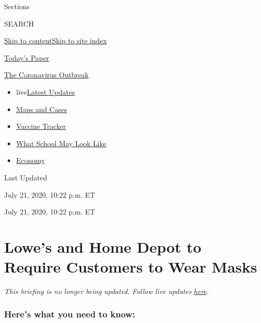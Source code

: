 Sections

SEARCH

\protect\hyperlink{site-content}{Skip to
content}\protect\hyperlink{site-index}{Skip to site index}

\href{https://myaccount.nytimes.com/auth/login?response_type=cookie\&client_id=vi}{}

\href{https://www.nytimes.com/section/todayspaper}{Today's Paper}

\href{https://www.nytimes.com/news-event/coronavirus}{The Coronavirus
Outbreak}

\begin{itemize}
\tightlist
\item
  live\href{https://www.nytimes.com/2020/08/01/world/coronavirus-covid-19.html}{Latest
  Updates}
\item
  \href{https://www.nytimes.com/interactive/2020/us/coronavirus-us-cases.html}{Maps
  and Cases}
\item
  \href{https://www.nytimes.com/interactive/2020/science/coronavirus-vaccine-tracker.html}{Vaccine
  Tracker}
\item
  \href{https://www.nytimes.com/interactive/2020/07/29/us/schools-reopening-coronavirus.html}{What
  School May Look Like}
\item
  \href{https://www.nytimes.com/live/2020/07/31/business/stock-market-today-coronavirus}{Economy}
\end{itemize}

Last Updated

July 21, 2020, 10:22 p.m. ET

July 21, 2020, 10:22 p.m. ET

\hypertarget{lowes-and-home-depot-to-require-customers-to-wear-masks}{%
\section{Lowe's and Home Depot to Require Customers to Wear
Masks}\label{lowes-and-home-depot-to-require-customers-to-wear-masks}}

\emph{This briefing is no longer being updated. Follow live updates}
\href{https://www.nytimes.com/2020/07/17/world/coronavirus-cases-update.html}{\emph{here}}\emph{.}

\hypertarget{heres-what-you-need-to-know}{%
\subsubsection{Here's what you need to
know:}\label{heres-what-you-need-to-know}}

